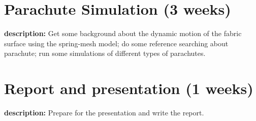 \documentclass[12pt]{article}
\begin{document}
\newpage
\section*{Parachute Simulation (3 weeks)}
\textbf{description:}
Get some background about the dynamic motion of the fabric surface using
the spring-mesh model; do some reference searching about parachute; run some
simulations of different types of parachutes.

\newpage
\section*{Report and presentation (1 weeks)}
\textbf{description:}
Prepare for the presentation and write the report.
\end{document}
